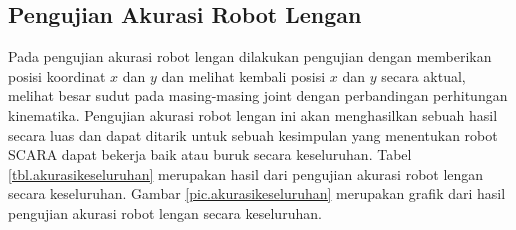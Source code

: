\subsection{Pengujian Akurasi Robot Lengan}
Pada pengujian akurasi robot lengan dilakukan pengujian dengan memberikan posisi koordinat $x$ dan $y$ dan melihat kembali posisi $x$ dan $y$ secara aktual, melihat besar sudut pada masing-masing joint dengan perbandingan perhitungan kinematika. Pengujian akurasi robot lengan ini akan menghasilkan sebuah hasil secara luas dan dapat ditarik untuk sebuah kesimpulan yang menentukan robot SCARA dapat bekerja baik atau buruk secara keseluruhan. Tabel \ref{tbl.akurasikeseluruhan} merupakan hasil dari pengujian akurasi robot lengan secara keseluruhan. Gambar \ref{pic.akurasikeseluruhan} merupakan grafik dari hasil pengujian akurasi robot lengan secara keseluruhan.

